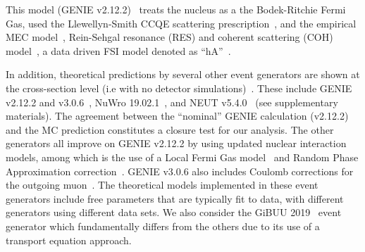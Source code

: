 \documentclass[aps,prl,showpacs,twocolumn,superscriptaddress,letterpaper,longbibliography]{revtex4-1}
\begin{document}
This model (GENIE v2.12.2)~\cite{Andreopoulos:2009rq,Andreopoulos:2015wxa} treats the nucleus as a  
the Bodek-Ritchie Fermi Gas, used
the Llewellyn-Smith CCQE scattering prescription~\cite{LlewellynSmith:1971uhs},
and the empirical MEC model~\cite{Katori:2013eoa},
 Rein-Sehgal resonance (RES) and coherent scattering (COH) model~\cite{Rein:1980wg},
 a data driven FSI model denoted as \enquote{hA}~\cite{Mashnik:2005ay}.

In addition, theoretical predictions by several other event generators are shown at the cross-section level (i.e with no detector simulations)~\cite{Stowell_2017}.
These include GENIE v2.12.2 and v3.0.6~\cite{Andreopoulos:2009rq,Andreopoulos:2015wxa}, NuWro 19.02.1~\cite{GolanNuWro:2008yp}, and NEUT v5.4.0~\cite{Hayato:2008yp}  (see supplementary materials).
The agreement between the ``nominal'' GENIE calculation (v2.12.2) and the MC prediction constitutes a closure test for our analysis. 
The other generators all improve on GENIE v2.12.2 by using updated nuclear interaction models, 
among which is the use of a Local Fermi Gas model~\cite{Carrasco:1989vq} and
Random Phase Approximation correction~\cite{RPA}.
GENIE v3.0.6 also includes Coulomb corrections for the outgoing muon~\cite{Engel:1997fy}.
The theoretical models implemented in these event generators include free parameters that are typically fit to data,
with different generators using different data sets.
We also consider the GiBUU 2019~\cite{Mosel:2008yp} event generator which fundamentally differs from the others due to its use of a transport equation approach.
\end{document}
